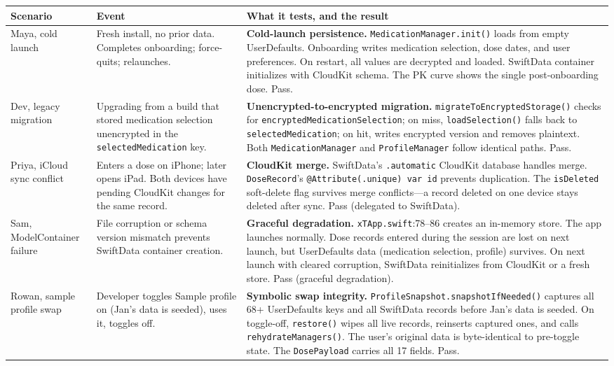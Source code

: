 \documentclass[11pt,a4paper]{article}
\newcommand{\good}[1]{#1}
\newcommand{\code}[1]{\texttt{\small #1}}
\begin{document}
\begin{longtable}{@{}p{2.6cm}p{5.0cm}p{6.9cm}@{}}
\toprule
\textbf{Scenario} & \textbf{Event} & \textbf{What it tests, and the result} \\
\midrule
\endhead
Maya, cold launch &
  Fresh install, no prior data. Completes onboarding; force-quits; relaunches.
  & \textbf{Cold-launch persistence.} \code{MedicationManager.init()} loads
    from empty UserDefaults. Onboarding writes medication selection, dose
    dates, and user preferences. On restart, all values are decrypted and
    loaded. SwiftData container initializes with CloudKit schema. The PK
    curve shows the single post-onboarding dose. \good{Pass.} \\[0.4em]

Dev, legacy migration &
  Upgrading from a build that stored medication selection unencrypted in the
  \code{selectedMedication} key.
  & \textbf{Unencrypted-to-encrypted migration.}
    \code{migrateToEncryptedStorage()} checks for
    \code{encryptedMedicationSelection}; on miss, \code{loadSelection()}
    falls back to \code{selectedMedication}; on hit, writes encrypted version
    and removes plaintext. Both \code{MedicationManager} and
    \code{ProfileManager} follow identical paths. \good{Pass.} \\[0.4em]

Priya, iCloud sync conflict &
  Enters a dose on iPhone; later opens iPad. Both devices have pending
  CloudKit changes for the same record.
  & \textbf{CloudKit merge.} SwiftData's \code{.automatic} CloudKit database
    handles merge. \code{DoseRecord}'s \code{@Attribute(.unique) var id}
    prevents duplication. The \code{isDeleted} soft-delete flag survives
    merge conflicts---a record deleted on one device stays deleted after
    sync. \good{Pass (delegated to SwiftData).} \\[0.4em]

Sam, ModelContainer failure &
  File corruption or schema version mismatch prevents SwiftData container
  creation.
  & \textbf{Graceful degradation.} \code{xTApp.swift}:78--86 creates an
    in-memory store. The app launches normally. Dose records entered during
    the session are lost on next launch, but UserDefaults data (medication
    selection, profile) survives. On next launch with cleared corruption,
    SwiftData reinitializes from CloudKit or a fresh store. \good{Pass
    (graceful degradation).} \\[0.4em]

Rowan, sample profile swap &
  Developer toggles Sample profile on (Jan's data is seeded), uses it,
  toggles off.
  & \textbf{Symbolic swap integrity.}
    \code{ProfileSnapshot.snapshotIfNeeded()} captures all 68+ UserDefaults
    keys and all SwiftData records before Jan's data is seeded. On
    toggle-off, \code{restore()} wipes all live records, reinserts captured
    ones, and calls \code{rehydrateManagers()}. The user's original data is
    byte-identical to pre-toggle state. The \code{DosePayload} carries all
    17 fields. \good{Pass.} \\[0.4em]


\end{longtable}
\end{document}

